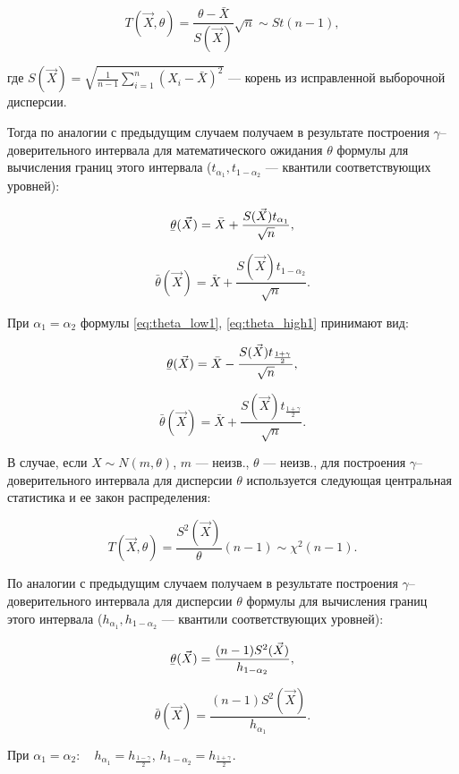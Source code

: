 \begin{equation}
	T(\vec{X}, \theta) = \frac{\theta - \bar{X}}{S(\vec{X})}\sqrt{n} \sim St(n - 1),
\end{equation}

где $S(\vec{X}) = \sqrt{ \frac{1}{n - 1} \sum\limits_{i = 1}^{n} (X_i - \bar{X})^2 }$ --- корень из исправленной выборочной дисперсии.

Тогда по аналогии с предыдущим случаем получаем в результате построения $\gamma$--доверительного интервала для математического ожидания $\theta$ формулы для вычисления границ этого интервала ($t_{\alpha_1}, t_{1 - \alpha_2}$ --- квантили соответствующих уровней):

\begin{equation}\label{eq:theta_low1}
	\ubar{\theta}(\vec{X}) = \bar{X} + \frac{S(\vec{X}) t_{\alpha_1}}{\sqrt{n}},
\end{equation}

\begin{equation}\label{eq:theta_high1}
	\bar{\theta}(\vec{X}) = \bar{X} + \frac{S(\vec{X}) t_{1 - \alpha_2}}{\sqrt{n}}.
\end{equation}

При $\alpha_1 = \alpha_2$ формулы \ref{eq:theta_low1}, \ref{eq:theta_high1} принимают вид:

\begin{equation}
	\ubar{\theta}(\vec{X}) = \bar{X} - \frac{S(\vec{X}) t_{ \frac{1 + \gamma}{2} } }{ \sqrt{n} },
\end{equation}

\begin{equation}
	\bar{\theta}(\vec{X}) = \bar{X} + \frac{S(\vec{X}) t_{ \frac{1 + \gamma}{2} } }{ \sqrt{n} }.
\end{equation}

В случае, если $X \sim N(m, \theta)$, $m$ --- неизв., $\theta$ --- неизв., для построения $\gamma$--доверительного интервала для дисперсии $\theta$ используется следующая центральная статистика и ее закон распределения:

\begin{equation}
	T(\vec{X}, \theta) = \frac{S^2(\vec{X})}{\theta}(n - 1) \sim \chi^2(n - 1).
\end{equation}

По аналогии с предыдущим случаем получаем в результате построения $\gamma$--доверительного интервала для дисперсии $\theta$ формулы для вычисления границ этого интервала ($h_{\alpha_1}, h_{1 - \alpha_2}$ --- квантили соответствующих уровней):

\begin{equation}
	\ubar{\theta}(\vec{X}) = \frac{(n - 1) S^2(\vec{X})}{h_{1 - \alpha_2}},
\end{equation}

\begin{equation}
	\bar{\theta}(\vec{X}) = \frac{(n - 1) S^2(\vec{X})}{h_{\alpha_1}}.
\end{equation}

При $\alpha_1 = \alpha_2: \quad h_{\alpha_1} = h_{\frac{1 - \gamma}{2}}$, $h_{1 - \alpha_2} = h_{\frac{1 + \gamma}{2}}$.
